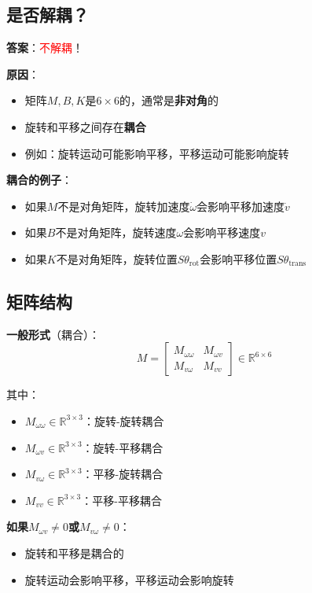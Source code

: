 \documentclass[12pt,a4paper]{article}
\begin{document}
\subsection{是否解耦？}

\textbf{答案}：\textcolor{red}{不解耦}！

\textbf{原因}：
\begin{itemize}
\item 矩阵$M, B, K$是$6 \times 6$的，通常是\textbf{非对角}的
\item 旋转和平移之间存在\textbf{耦合}
\item 例如：旋转运动可能影响平移，平移运动可能影响旋转
\end{itemize}

\textbf{耦合的例子}：
\begin{itemize}
\item 如果$M$不是对角矩阵，旋转加速度$\dot{\omega}$会影响平移加速度$\dot{v}$
\item 如果$B$不是对角矩阵，旋转速度$\omega$会影响平移速度$v$
\item 如果$K$不是对角矩阵，旋转位置$S\theta_{\text{rot}}$会影响平移位置$S\theta_{\text{trans}}$
\end{itemize}

\subsection{矩阵结构}

\textbf{一般形式}（耦合）：
\begin{equation}
M = \begin{bmatrix}
M_{\omega\omega} & M_{\omega v} \\
M_{v\omega} & M_{vv}
\end{bmatrix} \in \mathbb{R}^{6 \times 6}
\end{equation}

其中：
\begin{itemize}
\item $M_{\omega\omega} \in \mathbb{R}^{3 \times 3}$：旋转-旋转耦合
\item $M_{\omega v} \in \mathbb{R}^{3 \times 3}$：旋转-平移耦合
\item $M_{v\omega} \in \mathbb{R}^{3 \times 3}$：平移-旋转耦合
\item $M_{vv} \in \mathbb{R}^{3 \times 3}$：平移-平移耦合
\end{itemize}

\textbf{如果$M_{\omega v} \neq 0$或$M_{v\omega} \neq 0$}：
\begin{itemize}
\item 旋转和平移是耦合的
\item 旋转运动会影响平移，平移运动会影响旋转
\end{itemize}
\end{document}

